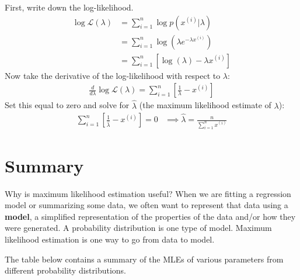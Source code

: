 First, write down the log-likelihood.
\begin{align*}
\log \mathcal{L}(\lambda) &= \sum_{i=1}^n \log p(x^{(i)}|\lambda) \\
&= \sum_{i=1}^n \log \left( \lambda e^{-\lambda x^{(i)}} \right) \\
&= \sum_{i=1}^n \left[\log(\lambda) - \lambda x^{(i)} \right] \end{align*}
Now take the derivative of the log-likelihood with respect to $\lambda$:
\begin{align*}
\frac{d}{d \lambda} \log \mathcal{L}(\lambda) = \sum_{i=1}^n \left[ \frac{1}{\lambda} - x^{(i)} \right]
\end{align*}
Set this equal to zero and solve for $\hat{\lambda}$ (the maximum likelihood estimate of $\lambda$):
\begin{align*} \sum_{i=1}^n \left[ \frac{1}{\hat{\lambda}} - x^{(i)} \right] = 0 & \implies \boxed{\hat{\lambda} = \frac{n}{\sum_{i=1}^n x^{(i)}}} \end{align*}

\section{Summary}

Why is maximum likelihood estimation useful? When we are fitting a regression model or summarizing some data, we often want to represent that data using a \textbf{model}, a simplified representation of the properties of the data and/or how they were generated. A probability distribution is one type of model. Maximum likelihood estimation is one way to go from data to model.

The table below contains a summary of the MLEs of various parameters from different probability distributions.

